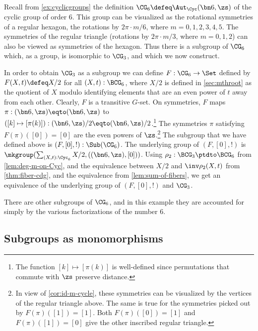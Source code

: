 \begin{example}
  \label{exa:C3subC6}%
Recall from \cref{ex:cyclicgroups} the definition 
$\CG_6\defeq\Aut_\Cyc(\bn6,\zs)$ of the cyclic group of order $6$.
This group can be visualized as the rotational symmetries of a regular
hexagon,  \ie the rotations by $2\pi\cdot m /6$, where $m=0,1,2,3,4,5$.
The symmetries of the regular triangle (rotations by $2\pi\cdot m/3$, 
where $m=0,1,2$) can also be viewed as symmetries of the hexagon.
Thus there is a subgroup of $\CG_6$ which, as a group, is isomorphic to 
$\CG_3$, and which we now construct.

In order to obtain $\CG_3$ as a subgroup we can define
$F : \CG_6 \to \Set$ defined by $F(X,t) \defeq X/2$ for all $(X,t):\BCG_6$,
where $X/2$ is defined in \cref{sec:mthroot} as the quotient of $X$
modulo identifying elements that are an even power of $t$ away from each other.
Clearly, $F$ is a transitive $G$-set.
On symmetries, $F$ maps $\pi : (\bn6,\zs) \eqto (\bn6,\zs)$ to 
$([k] \mapsto [\pi(k)]) : (\bn6,\zs)/2 \eqto (\bn6,\zs)/2$.\footnote{%
The function $[k] \mapsto [\pi(k)]$ is well-defined since
permutations that commute with $\zs$ preserve distance.}
The symmetries $\pi$ satisfying $F(\pi)([0])=[0]$ are the
even powers of $\zs$.\footnote{%
In view of \cref{cor:id-m-cycle}, these symmetries can be visualized 
by the vertices of the regular triangle above.
The same is true for the symmetries picked out by $F(\pi)([1])=[1]$.
Both $F(\pi)([0])=[1]$ and $F(\pi)([1])=[0]$ give the other inscribed
regular triangle.} 
The subgroup that we have defined above is $(F,[0],!) : \Sub(\CG_6)$.
The underlying group of $(F,[0],!)$ is 
$\mkgroup(\sum_{(X,t):\Cyc_6} X/2, ((\bn6,\zs),[0]))$.
Using $\rho_2: \BCG_3 \ptdto \BCG_6$ from \cref{lem:deg-m-on-Cyc},
and the equivalence between $X/2$ and $\inv\rho_2 (X,t)$ from
\cref{thm:fiber-cdg}, and the equivalence from \cref{lem:sum-of-fibers},
we get an equivalence of the underlying group of  $(F,[0],!)$ and $\CG_3$.
\end{example}

There are other subgroups of $\CG_6$, and in this example they are accounted for simply by the various factorizations of the number $6$.

\subsection{Subgroups as monomorphisms}


